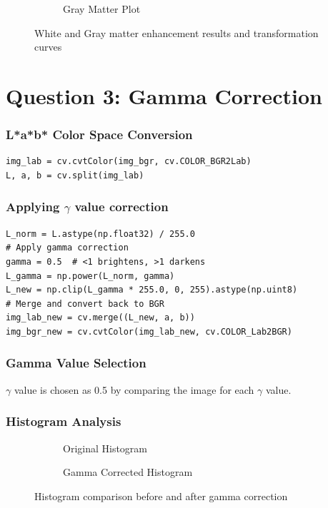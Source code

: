 \documentclass[11pt]{article}
\begin{document}
\begin{figure}[H]
\begin{subfigure}{0.26\textwidth}
        \caption{Gray Matter Plot}
    \end{subfigure}
    \caption{White and Gray matter enhancement results and transformation curves}
\end{figure}


\section*{Question 3: Gamma Correction}
\subsubsection*{L*a*b* Color Space Conversion}
\begin{lstlisting}[style=pythonstyle]
img_lab = cv.cvtColor(img_bgr, cv.COLOR_BGR2Lab)
L, a, b = cv.split(img_lab)
\end{lstlisting}
\subsubsection*{Applying $\gamma$ value correction}
\begin{lstlisting}[style=pythonstyle]
L_norm = L.astype(np.float32) / 255.0  
# Apply gamma correction
gamma = 0.5  # <1 brightens, >1 darkens
L_gamma = np.power(L_norm, gamma)
L_new = np.clip(L_gamma * 255.0, 0, 255).astype(np.uint8)
# Merge and convert back to BGR
img_lab_new = cv.merge((L_new, a, b))
img_bgr_new = cv.cvtColor(img_lab_new, cv.COLOR_Lab2BGR)
\end{lstlisting}
\subsubsection*{Gamma Value Selection}
$\gamma$ value is chosen as 0.5 by comparing the image for each $\gamma$ value.

\subsubsection*{Histogram Analysis}
\begin{figure}[H]
    \centering
    \begin{subfigure}{0.45\textwidth}
        \fbox{\rule{0pt}{1.5in}\rule{2in}{0pt}}
        \caption{Original Histogram}
    \end{subfigure}
    \hfill
    \begin{subfigure}{0.45\textwidth}
        \fbox{\rule{0pt}{1.5in}\rule{2in}{0pt}}
        \caption{Gamma Corrected Histogram}
    \end{subfigure}
    \caption{Histogram comparison before and after gamma correction}
\end{figure}
\end{document}
